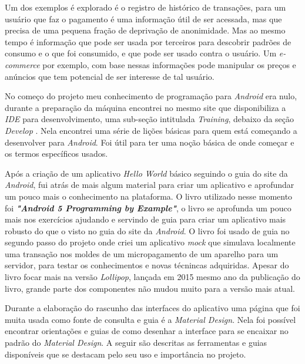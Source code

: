 \documentclass[hidelinks,12pt]{article}
\begin{document}
Um dos exemplos \'e explorado \'e o registro de hist\'orico de transa\c{c}\~oes, para um usu\'ario que faz o pagamento \'e uma informa\c{c}\~ao \'util de ser acessada, mas que precisa de uma pequena fra\c{c}\~ao de depriva\c{c}\~ao de anonimidade. Mas ao mesmo tempo \'e informa\c{c}\~ao que pode ser usada por terceiros para descobrir padr\~oes de consumo e o que foi consumido, e que pode ser usado contra o usu\'ario. Um \textit{e-commerce} por exemplo, com base nessas informa\c{c}\~oes pode manipular os pre\c{c}os e an\'uncios que tem potencial de ser interesse de tal usu\'ario.

No come\c{c}o do projeto meu conhecimento de programa\c{c}\~ao para \textit{Android} era nulo, durante a prepara\c{c}\~ao da m\'aquina encontrei no mesmo site que disponibiliza a \textit{IDE} para desenvolvimento, uma sub-se\c{c}\~ao intitulada \textit{Training}, debaixo da se\c{c}\~ao \textit{Develop} \cite{anddev}. Nela encontrei uma s\'erie de li\c{c}\~oes b\'asicas para quem est\'a come\c{c}ando a desenvolver para \textit{Android}. Foi \'util para ter uma no\c{c}\~ao b\'asica de onde come\c{c}ar e os termos espec\'ificos usados.

Ap\'os a cria\c{c}\~ao de um aplicativo \textit{Hello World} b\'asico seguindo o guia \cite{androidhw} do site da \textit{Android}, fui atr\'as de mais algum material para criar um aplicativo e aprofundar um pouco mais o conhecimento na plataforma. O livro \cite{andppe} utilizado nesse momento foi \textbf{\textit{"Android 5 Programming by Example"}}, o livro \cite{andppe} se aprofunda um pouco mais nos exerc\'icios ajudando e servindo de guia para criar um aplicativo mais robusto do que o visto no guia do site da \textit{Android}. O livro \cite{andppe} foi usado de guia no segundo passo do projeto onde criei um aplicativo \textit{mock} que simulava localmente uma transa\c{c}\~ao nos moldes de um micropagamento de um aparelho para um servidor, para testar os conhecimentos e novas t\'ecnincas adquiridas. Apesar do livro \cite{andppe} focar mais na vers\~ao \textit{Lollipop}, lan\c{c}ada em 2015 mesmo ano da publica\c{c}\~ao do livro, grande parte dos componentes n\~ao mudou muito para a vers\~ao mais atual.


Durante a elabora\c{c}\~ao do rascunho das interfaces do aplicativo uma p\'agina \cite{material} que foi muita usada como fonte de consulta e guia \'e a \textit{Material Design}. Nela foi poss\'ivel encontrar orienta\c{c}\~oes e guias de como desenhar a interface para se encaixar no padr\~ao do \textit{Material Design}. A seguir s\~ao descritas as ferramentas e guias dispon\'iveis que se destacam pelo seu uso e importância no projeto.
\end{document}

